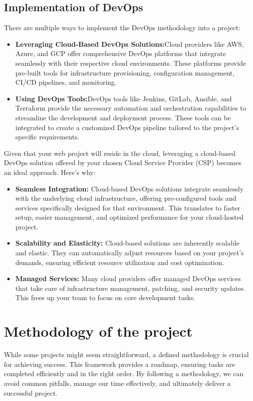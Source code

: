\subsection*{Implementation of DevOps}
There are multiple ways to implement the DevOps methodology into a project:
\begin{itemize}
    \item \textbf{Leveraging Cloud-Based DevOps Solutions:}Cloud providers like AWS, Azure, and GCP offer comprehensive DevOps platforms that integrate seamlessly with their respective cloud environments. These platforms provide pre-built tools for infrastructure provisioning, configuration management, CI/CD pipelines, and monitoring.
    \item \textbf{Using DevOps Tools:}DevOps tools like Jenkins, GitLab, Ansible, and Terraform provide the necessary automation and orchestration capabilities to streamline the development and deployment process. These tools can be integrated to create a customized DevOps pipeline tailored to the project's specific requirements.
\end{itemize}
Given that your web project will reside in the cloud, leveraging a cloud-based DevOps solution offered by your chosen Cloud Service Provider (CSP) becomes an ideal approach. Here's why:
\begin{itemize}
    \item \textbf{Seamless Integration:} Cloud-based DevOps solutions integrate seamlessly with the underlying cloud infrastructure, offering pre-configured tools and services specifically designed for that environment. This translates to faster setup, easier management, and optimized performance for your cloud-hosted project.
    \item \textbf{Scalability and Elasticity:} Cloud-based solutions are inherently scalable and elastic. They can automatically adjust resources based on your project's demands, ensuring efficient resource utilization and cost optimization.
    \item \textbf{Managed Services:} Many cloud providers offer managed DevOps services that take care of infrastructure management, patching, and security updates. This frees up your team to focus on core development tasks.
\end{itemize}

\section{Methodology of the project}
While some projects might seem straightforward, a defined methodology is crucial for achieving success.  This framework provides a roadmap, ensuring tasks are completed efficiently and in the right order. By following a methodology, we can avoid common pitfalls, manage our time effectively, and ultimately deliver a successful project.

